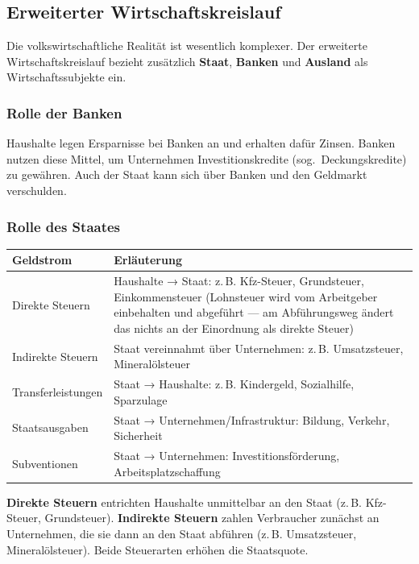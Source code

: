 \documentclass[11pt, a4paper]{article}
\begin{document}
\subsection{Erweiterter Wirtschaftskreislauf}

Die volkswirtschaftliche Realität ist wesentlich komplexer. Der erweiterte Wirtschaftskreislauf
bezieht zusätzlich \textbf{Staat}, \textbf{Banken} und \textbf{Ausland} als Wirtschaftssubjekte ein.

\subsubsection*{Rolle der Banken}

Haushalte legen Ersparnisse bei Banken an und erhalten dafür Zinsen. Banken nutzen diese
Mittel, um Unternehmen Investitionskredite (sog.\ Deckungskredite) zu gewähren. Auch der
Staat kann sich über Banken und den Geldmarkt verschulden.

\subsubsection*{Rolle des Staates}

\begin{center}
\begin{tabular}{p{4cm} p{8.5cm}}
\toprule
\textbf{Geldstrom} & \textbf{Erläuterung}\\
\midrule
Direkte Steuern & Haushalte → Staat: z.\,B. Kfz-Steuer, Grundsteuer, Einkommensteuer\newline
{\footnotesize (Lohnsteuer wird vom Arbeitgeber einbehalten und abgeführt — am Abführungsweg ändert das nichts an der Einordnung als direkte Steuer)}\\
\addlinespace
Indirekte Steuern & Staat vereinnahmt über Unternehmen: z.\,B. Umsatzsteuer, Mineralölsteuer\\
\addlinespace
Transferleistungen & Staat → Haushalte: z.\,B. Kindergeld, Sozialhilfe, Sparzulage\\
\addlinespace
Staatsausgaben & Staat → Unternehmen/Infrastruktur: Bildung, Verkehr, Sicherheit\\
\addlinespace
Subventionen & Staat → Unternehmen: Investitionsförderung, Arbeitsplatzschaffung\\
\bottomrule
\end{tabular}
\end{center}

\begin{merksatz}[title={\bfseries Merke: Direkte vs. indirekte Steuern}]
\textbf{Direkte Steuern} entrichten Haushalte unmittelbar an den Staat (z.\,B. Kfz-Steuer,
Grundsteuer). \textbf{Indirekte Steuern} zahlen Verbraucher zunächst an Unternehmen, die
sie dann an den Staat abführen (z.\,B. Umsatzsteuer, Mineralölsteuer). Beide Steuerarten
erhöhen die Staatsquote.
\end{merksatz}
\end{document}
